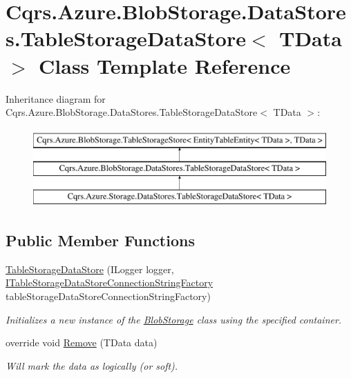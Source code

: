 \hypertarget{classCqrs_1_1Azure_1_1BlobStorage_1_1DataStores_1_1TableStorageDataStore}{}\section{Cqrs.\+Azure.\+Blob\+Storage.\+Data\+Stores.\+Table\+Storage\+Data\+Store$<$ T\+Data $>$ Class Template Reference}
\label{classCqrs_1_1Azure_1_1BlobStorage_1_1DataStores_1_1TableStorageDataStore}
Inheritance diagram for Cqrs.\+Azure.\+Blob\+Storage.\+Data\+Stores.\+Table\+Storage\+Data\+Store$<$ T\+Data $>$\+:\begin{figure}[H]
\begin{center}
\leavevmode
\includegraphics[height=3.000000cm]{classCqrs_1_1Azure_1_1BlobStorage_1_1DataStores_1_1TableStorageDataStore}
\end{center}
\end{figure}
\subsection*{Public Member Functions}
\begin{DoxyCompactItemize}
\item 
\hyperlink{classCqrs_1_1Azure_1_1BlobStorage_1_1DataStores_1_1TableStorageDataStore_a29c0fb07b5b5e6655a24cc831484646a}{Table\+Storage\+Data\+Store} (I\+Logger logger, \hyperlink{interfaceCqrs_1_1Azure_1_1BlobStorage_1_1DataStores_1_1ITableStorageDataStoreConnectionStringFactory}{I\+Table\+Storage\+Data\+Store\+Connection\+String\+Factory} table\+Storage\+Data\+Store\+Connection\+String\+Factory)
\begin{DoxyCompactList}\small\item\em Initializes a new instance of the \hyperlink{namespaceCqrs_1_1Azure_1_1BlobStorage}{Blob\+Storage} class using the specified container. \end{DoxyCompactList}\item 
override void \hyperlink{classCqrs_1_1Azure_1_1BlobStorage_1_1DataStores_1_1TableStorageDataStore_a724d1188cdac6a7bfe7c753480f0c09a}{Remove} (T\+Data data)
\begin{DoxyCompactList}\small\item\em Will mark the {\itshape data}  as logically (or soft). \end{DoxyCompactList}\end{DoxyCompactItemize}

